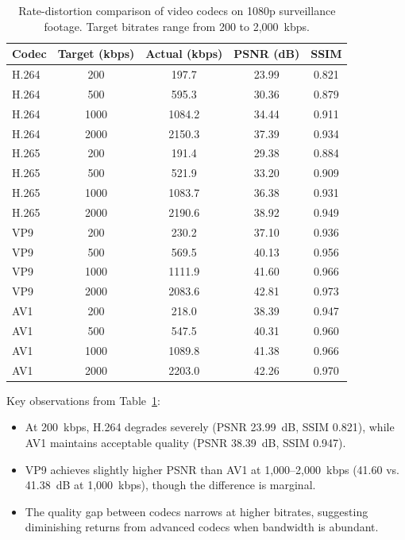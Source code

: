 \begin{table}[t]
\centering
\caption{Rate-distortion comparison of video codecs on 1080p surveillance footage. Target bitrates range from 200 to 2{,}000~kbps.}
\label{tab:sota_comparison}
\begin{tabular}{lcccc}
\toprule
\textbf{Codec} & \textbf{Target (kbps)} & \textbf{Actual (kbps)} & \textbf{PSNR (dB)} & \textbf{SSIM} \\
\midrule
H.264  & 200   & 197.7  & 23.99 & 0.821 \\
H.264  & 500   & 595.3  & 30.36 & 0.879 \\
H.264  & 1000  & 1084.2 & 34.44 & 0.911 \\
H.264  & 2000  & 2150.3 & 37.39 & 0.934 \\
\midrule
H.265  & 200   & 191.4  & 29.38 & 0.884 \\
H.265  & 500   & 521.9  & 33.20 & 0.909 \\
H.265  & 1000  & 1083.7 & 36.38 & 0.931 \\
H.265  & 2000  & 2190.6 & 38.92 & 0.949 \\
\midrule
VP9    & 200   & 230.2  & 37.10 & 0.936 \\
VP9    & 500   & 569.5  & 40.13 & 0.956 \\
VP9    & 1000  & 1111.9 & 41.60 & 0.966 \\
VP9    & 2000  & 2083.6 & 42.81 & 0.973 \\
\midrule
AV1    & 200   & 218.0  & 38.39 & 0.947 \\
AV1    & 500   & 547.5  & 40.31 & 0.960 \\
AV1    & 1000  & 1089.8 & 41.38 & 0.966 \\
AV1    & 2000  & 2203.0 & 42.26 & 0.970 \\
\bottomrule
\end{tabular}
\end{table}

Key observations from Table~\ref{tab:sota_comparison}:
\begin{itemize}
    \item At 200~kbps, H.264 degrades severely (PSNR 23.99~dB, SSIM 0.821), while AV1 maintains acceptable quality (PSNR 38.39~dB, SSIM 0.947).
    \item VP9 achieves slightly higher PSNR than AV1 at 1{,}000--2{,}000~kbps (41.60 vs. 41.38~dB at 1{,}000~kbps), though the difference is marginal.
    \item The quality gap between codecs narrows at higher bitrates, suggesting diminishing returns from advanced codecs when bandwidth is abundant.
\end{itemize}

